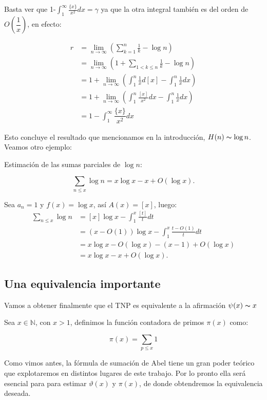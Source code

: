 Basta ver que 1-$\displaystyle\int_1^{\infty}\frac{\{x\}}{x^2}dx=\gamma$ ya que la otra integral también es del orden de $O\left(\dfrac{1}{x}\right)$, en efecto:

$$
\begin{aligned}
r & =\lim _{n \rightarrow \infty}\left(\sum_{k=1}^n \frac{1}{k}-\log n\right) \\
& =\lim _{n \rightarrow \infty}\left(1+\sum_{1<k \leq n} \frac{1}{k}-\log n\right) \\
& =1+\lim _{n \rightarrow \infty}\left(\int_1^n \frac{1}{x} d[x]-\int_1^n \frac{1}{x} d x\right) \\
& =1+\lim _{n \rightarrow \infty}\left(\int_1^n \frac{[x]}{x^2} d x-\int_1^n \frac{1}{x} d x\right)\\
&=1-\int_1^{\infty}\dfrac{\{x\}}{x^2}dx
\end{aligned}
$$

Esto concluye el resultado que mencionamos en la introducción, $H(n)\thicksim \log n$. Veamos otro ejemplo:

\begin{eg}
Estimación de las sumas parciales de $\log n$:

$$
\sum_{n \leq x} \log n=x \log x-x+O(\log x) .
$$

Sea $a_n=1$ y $f(x)=\log x$, así $A(x)=[x]$, luego:
$$
\begin{aligned}
\sum_{n \leq x} \log n & =[x] \log x-\int_1^x \frac{[t]}{t} d t \\
& =(x-O(1)) \log x-\int_1^x \frac{t-O(1)}{t} d t \\
& =x \log x-O(\log x)-(x-1)+O(\log x) \\
& =x \log x-x+O(\log x) .
\end{aligned}
$$
\end{eg}

\subsection{Una equivalencia importante}

Vamos a obtener finalmente que el TNP es equivalente a la afirmación $\psi(x)\thicksim x$

\begin{definition}
Sea $x\in \mathbb{N}$, con $x>1$, definimos la función contadora de primos $\pi(x)$ como: 

    $$\pi(x)=\displaystyle\sum_{p\leq x}1$$
\end{definition}


 Como vimos antes, la fórmula de sumación  de Abel tiene un gran poder teórico que explotaremos en distintos lugares de este trabajo. Por lo pronto ella será esencial para para estimar $\vartheta(x)$ y $\pi(x)$, de donde obtendremos la equivalencia deseada.

